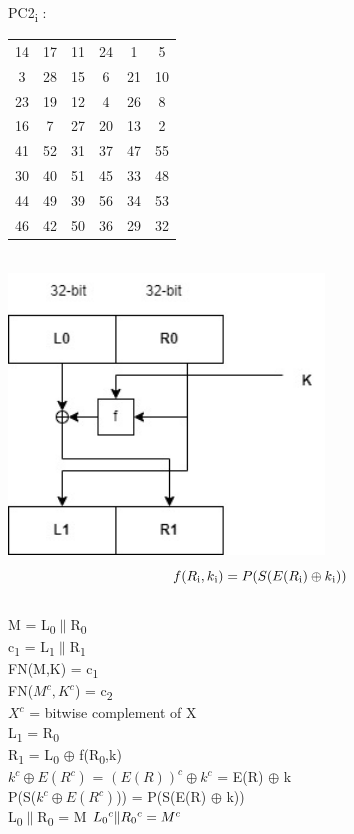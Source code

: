 \documentclass[11pt]{article}
\begin{document}
	PC2\textsubscript{i} :
	\begin{tabular}{ c c c c c c }
		14 & 17 &11& 24& 1 &5\\
		3 &28 &15& 6& 21 &10\\
		23 &19 &12& 4 &26& 8\\
		16 &7 &27 &20 &13& 2\\
		41 &52 &31 &37 &47 &55\\
		30 &40 &51 &45& 33 &48\\
		44 &49& 39& 56 &34& 53\\
		46 &42 &50 &36 &29 &32
	\end{tabular}\\
	
	\centering\includegraphics[width = 8.4cm]{DES 2 (1).jpg}
	\flushleft$$f(R\textsubscript{i},k\textsubscript{i}) = P(S(E(R\textsubscript{i}) \oplus k\textsubscript{i}))$$\\
	M = L\textsubscript{0}$\|$R\textsubscript{0}\\
	c\textsubscript{1} = L\textsubscript{1}$\|$R\textsubscript{1}\\
	FN(M,K) = c\textsubscript{1}\\
	FN($M^{c},K^{c}$) = c\textsubscript{2}\\ \hfill $X^{c}$ = bitwise complement of X\\
	L\textsubscript{1} = R\textsubscript{0}\\
	R\textsubscript{1} = L\textsubscript{0} $\oplus$ f(R\textsubscript{0},k)\\
	$k^c \oplus E(R^c)$ = $(E(R))^c \oplus k^c$ = E(R) $\oplus$ k\\
	P(S($k^c \oplus E(R^c)$)) = P(S(E(R) $\oplus$ k))\\
	L\textsubscript{0}$\|$R\textsubscript{0} = M \hspace{1cm} $L\textsubscript{0}^c\|R\textsubscript{0}^c = M^c$\\
\end{document}
